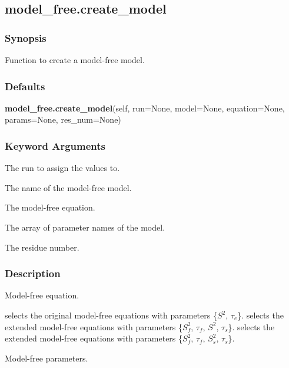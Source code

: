 


\newpage

\subsection{model\_free.create\_model}


\subsubsection{Synopsis}

Function to create a model-free model.

\subsubsection{Defaults}

\textsf{\textbf{model\_free.create\_model}(self, run=None, model=None, equation=None, params=None, res\_num=None)}


\subsubsection{Keyword Arguments}


  The run to assign the values to.

  The name of the model-free model.

  The model-free equation.

  The array of parameter names of the model.

  The residue number.

\subsubsection{Description}

Model-free equation.

 selects the original model-free equations with parameters \{$S^2$, $\tau_e$\}.
 selects the extended model-free equations with parameters \{$S^2_f$, $\tau_f$, $S^2$, $\tau_s$\}.
 selects the extended model-free equations with parameters \{$S^2_f$, $\tau_f$, $S^2_s$, $\tau_s$\}.


Model-free parameters.

